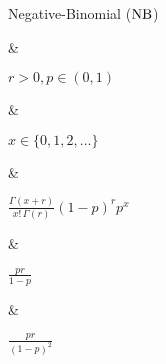 Negative-Binomial ($\operatorname{NB}$)

&

$r > 0, p \in (0, 1)$

& 

$x \in \{0, 1, 2, \dotsc\}$

&

\(\displaystyle
	\frac{\Gamma(x + r)}{x!\,\Gamma(r)} (1 - p)^r p^x
\)

& 

$\frac{pr}{1 - p}$

&

$\frac{pr}{(1 - p)^2}$